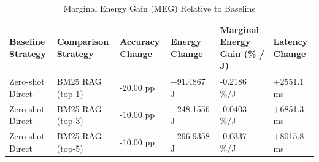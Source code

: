 \begin{table}
\caption{Marginal Energy Gain (MEG) Relative to Baseline}
\label{tab:marginal_energy_gain}
\begin{tabular}{llllll}
\toprule
Baseline Strategy & Comparison Strategy & Accuracy Change & Energy Change & Marginal Energy Gain (\% / J) & Latency Change \\
\midrule
Zero-shot Direct & BM25 RAG (top-1) & -20.00 pp & +91.4867 J & -0.2186 \%/J & +2551.1 ms \\
Zero-shot Direct & BM25 RAG (top-3) & -10.00 pp & +248.1556 J & -0.0403 \%/J & +6851.3 ms \\
Zero-shot Direct & BM25 RAG (top-5) & -10.00 pp & +296.9358 J & -0.0337 \%/J & +8015.8 ms \\
\bottomrule
\end{tabular}
\end{table}
